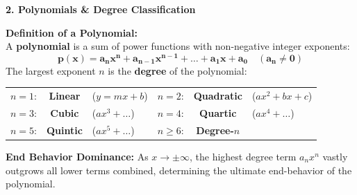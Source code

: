 \documentclass[10.5pt]{article}
\begin{document}
\vspace{0.04in}

\textbf{\large 2. Polynomials \& Degree Classification}

\begin{tcolorbox}[colback=chalkblue!6, colframe=chalkblue, boxrule=1pt, arc=3pt, left=8pt, right=8pt, top=4pt, bottom=4pt]
\textbf{Definition of a Polynomial:}\\[1pt]
A \textbf{polynomial} is a sum of power functions with non-negative integer exponents:
\[
  \mathbf{p(x) = a_n x^n + a_{n-1} x^{n-1} + \dots + a_1 x + a_0 \quad (a_n \ne 0)}
\]
The largest exponent $n$ is the \textbf{degree} of the polynomial:
\begin{center}
\begin{tabular}{lcl|lcl}
  $n = 1$: & \textbf{Linear} & ($y = mx + b$) & $n = 2$: & \textbf{Quadratic} & ($ax^2 + bx + c$) \\
  $n = 3$: & \textbf{Cubic} & ($ax^3 + \dots$) & $n = 4$: & \textbf{Quartic} & ($ax^4 + \dots$) \\
  $n = 5$: & \textbf{Quintic} & ($ax^5 + \dots$) & $n \ge 6$: & \textbf{Degree-$n$} & \\
\end{tabular}
\end{center}
\end{tcolorbox}

\vspace{0.03in}

\textbf{End Behavior Dominance:}
As $x \to \pm\infty$, the highest degree term $a_n x^n$ vastly outgrows all lower terms combined, determining the ultimate end-behavior of the polynomial.
\end{document}

